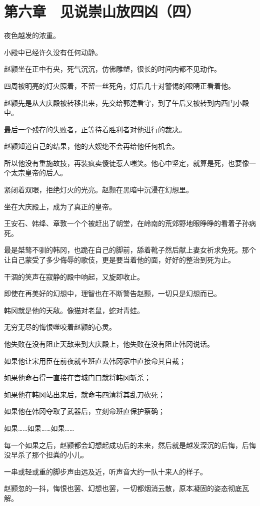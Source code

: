 \section{第六章　见说崇山放四凶（四）}

夜色越发的浓重。

小殿中已经许久没有任何动静。

赵颢坐在正中冇央，死气沉沉，仿佛雕塑，很长的时间内都不见动作。

四周被明亮的灯火照着，不留一丝死角，灯后几十对警惕的眼睛正看着他。

赵颢先是从大庆殿被转移出来，先交给郭逵看守，到了午后又被转到内西门小殿中。

最后一个残存的失败者，正等待着胜利者对他进行的裁决。

赵颢知道自己的结果，他的大嫂绝不会再给他任何机会。

所以他没有重施故技，再装疯卖傻徒惹人嗤笑。他心中坚定，就算是死，也要像一个太宗皇帝的后人。

紧闭着双眼，拒绝灯火的光亮。赵颢在黑暗中沉浸在幻想里。

坐在大庆殿上，成为了真正的皇帝。

王安石、韩绛、章敦一个个被赶出了朝堂，在岭南的荒郊野地眼睁睁的看着子孙病死。

最是桀骜不驯的韩冈，也跪在自己的脚前，舔着靴子然后献上妻女祈求免死。那个让自己蒙受了多少侮辱的歌伎，更是要当着他的面，好好的整治到死为止。

干涸的笑声在寂静的殿中响起，又旋即收止。

即使在再美好的幻想中，理智也在不断警告赵颢，一切只是幻想而已。

韩冈就是他的天敌。像猫对老鼠，蛇对青蛙。

无穷无尽的悔恨噬咬着赵颢的心灵。

他失败在没有阻止天敌来到大庆殿上，他失败在没有阻止韩冈说话。

如果他让宋用臣在前夜就率班直去韩冈家中直接命其自裁；

如果他命石得一直接在宫城门口就将韩冈斩杀；

如果他在韩冈站出来后，就命韦四清将其乱刀砍死；

如果他在韩冈夺取了武器后，立刻命班直保护蔡确；

如果……如果……如果……

每一个如果之后，赵颢都会幻想起成功后的未来，然后就是越发深沉的后悔，后悔没早杀了那个担粪的小儿。

一串或轻或重的脚步声由远及近，听声音大约一队十来人的样子。

赵颢忽的一抖，悔恨也罢、幻想也罢，一切都烟消云散，原本凝固的姿态彻底瓦解。

